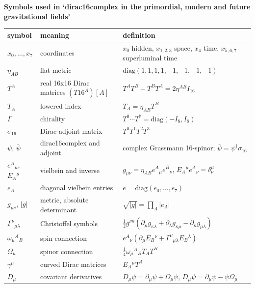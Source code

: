 \documentclass[10pt]{article}
\begin{document}
{\raggedright\LARGE\bfseries Symbols used in `dirac16complex in the primordial, modern and future gravitational fields'\par}\medskip

{\small\begin{longtable}{>{\raggedright\arraybackslash}p{}>{\raggedright\arraybackslash}p{}>{\raggedright\arraybackslash}p{}}\toprule
symbol & meaning & definition \\\midrule\endhead
\bottomrule\endfoot
$x_0,\dots,x_7$ & coordinates & $x_0$ hidden, $x_{1,2,3}$ space, $x_4$ time, $x_{5,6,7}$ superluminal time \\
$\eta_{AB}$ & flat metric & $\mathrm{diag}(1,1,1,1,-1,-1,-1,-1)$ \\
$T^A$ & real 16x16 Dirac matrices $(T16^A)[A]$ & $T^AT^B+T^BT^A=2\eta^{AB}I_{16}$ \\
$T_A$ & lowered index & $T_A=\eta_{AB}T^B$ \\
$\Gamma$ & chirality & $T^0\cdots T^7=\mathrm{diag}(-I_8,I_8)$ \\
$\sigma_{16}$ & Dirac-adjoint matrix & $T^0T^1T^2T^3$ \\
$\psi$, $\bar\psi$ & dirac16complex and adjoint & complex Grassmann 16-spinor; $\bar\psi=\psi^\dagger\sigma_{16}$ \\
$e^A{}_\mu$, $E_A{}^\mu$ & vielbein and inverse & $g_{\mu\nu}=\eta_{AB}e^A{}_\mu e^B{}_\nu$, $E_A{}^\mu e^A{}_\nu=\delta^\mu_\nu$ \\
$e_A$ & diagonal vielbein entries & $e=\mathrm{diag}(e_0,\dots,e_7)$ \\
$g_{\mu\nu}$, $\lvert g\rvert$ & metric, absolute determinant & $\sqrt{\lvert g\rvert}=\prod_A\lvert e_A\rvert$ \\
$\Gamma^\nu{}_{\mu\lambda}$ & Christoffel symbols & $\frac12g^{\nu\kappa}(\partial_\mu g_{\kappa\lambda}+\partial_\lambda g_{\kappa\mu}-\partial_\kappa g_{\mu\lambda})$ \\
$\omega_\mu{}^A{}_B$ & spin connection & $e^A{}_\nu(\partial_\mu E_B{}^\nu+\Gamma^\nu{}_{\mu\lambda}E_B{}^\lambda)$ \\
$\Omega_\mu$ & spinor connection & $\frac14\omega_\mu{}^A{}_BT_AT^B$ \\
$\gamma^\mu$ & curved Dirac matrices & $E_A{}^\mu T^A$ \\
$D_\mu$ & covariant derivatives & $D_\mu\psi=\partial_\mu\psi+\Omega_\mu\psi$, $D_\mu\bar\psi=\partial_\mu\bar\psi-\bar\psi\Omega_\mu$ \\

\end{longtable}}
\end{document}
